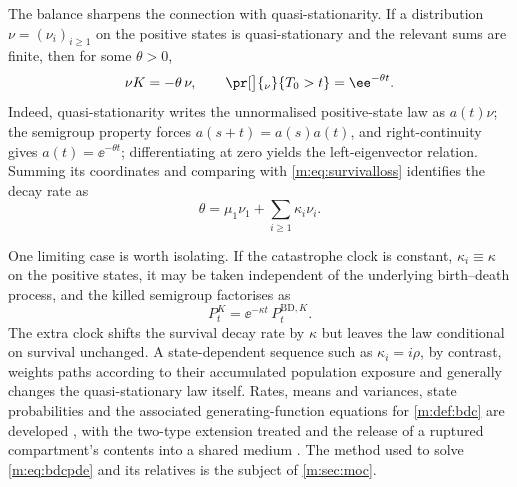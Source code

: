 The balance sharpens the connection with quasi-stationarity. If a distribution
$\nu=(\nu_i)_{i\ge1}$ on the positive states is quasi-stationary and the relevant
sums are finite, then for some $\theta>0$,
\begin{equation}
\label{m:eq:qsdeigen}
\nu K = -\theta\,\nu,
\qquad
\pr[\big]{_\nu}{T_0>t} = \ee^{-\theta t} .
\end{equation}
Indeed, quasi-stationarity writes the unnormalised positive-state law as
$a(t)\nu$; the semigroup property forces $a(s+t)=a(s)a(t)$, and right-continuity
gives $a(t)=\ee^{-\theta t}$; differentiating at zero yields the left-eigenvector
relation. Summing its coordinates and comparing with \cref{m:eq:survivalloss}
identifies the decay rate as
\begin{equation}
\label{m:eq:thetarate}
\theta = \mu_1\nu_1 + \sum_{i\ge1}\kappa_i\nu_i .
\end{equation}

One limiting case is worth isolating. If the catastrophe clock is constant,
$\kappa_i\equiv\kappa$ on the positive states, it may be taken independent of the
underlying birth--death process, and the killed semigroup factorises as
\begin{equation*}
P_t^{K} = \ee^{-\kappa t}\,P_t^{\mathrm{BD},K} .
\end{equation*}
The extra clock shifts the survival decay rate by $\kappa$ but leaves the law
conditional on survival unchanged. A state-dependent sequence such as
$\kappa_i=i\rho$, by contrast, weights paths according to their accumulated
population exposure and generally changes the quasi-stationary law itself. Rates,
means and variances, state probabilities and the associated generating-function
equations for \cref{m:def:bdc} are developed , with the two-type extension treated
 and the release of a
ruptured compartment's contents into a shared medium . The method used to solve \cref{m:eq:bdcpde} and its
relatives is the subject of \cref{m:sec:moc}.

\FloatBarrier
